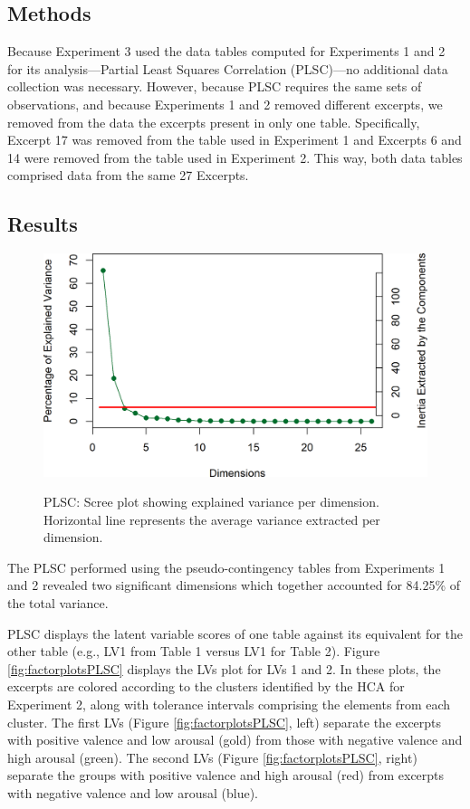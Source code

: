 \documentclass[
  english,
  man]{apa6}
\begin{document}
\hypertarget{methods-2}{%
\subsection{Methods}\label{methods-2}}

Because Experiment 3 used the data tables computed for Experiments 1 and 2 for its analysis---Partial Least Squares Correlation (PLSC)---no additional data collection was necessary. However, because PLSC requires the same sets of observations, and because Experiments 1 and 2 removed different excerpts, we removed from the data the excerpts present in only one table. Specifically, Excerpt 17 was removed from the table used in Experiment 1 and Excerpts 6 and 14 were removed from the table used in Experiment 2. This way, both data tables comprised data from the same 27 Excerpts.

\hypertarget{results-2}{%
\subsection{Results}\label{results-2}}

\begin{figure}  
  \begin{center}
  \caption{PLSC: Scree plot showing explained variance per dimension. Horizontal line represents the average variance extracted per dimension.}
    \includegraphics[width=0.6\columnwidth]{./Music-Descriptor-Space_files/figure-latex/screePLSCcode-1.png}
  \label{fig:screePLSC}  
 \end{center}
\end{figure}

The PLSC performed using the pseudo-contingency tables from Experiments 1 and 2 revealed two significant dimensions which together accounted for 84.25\% of the total variance.

PLSC displays the latent variable scores of one table against its equivalent for the other table (e.g., LV1 from Table 1 versus LV1 for Table 2). Figure \ref{fig:factorplotsPLSC} displays the LVs plot for LVs 1 and 2. In these plots, the excerpts are colored according to the clusters identified by the HCA for Experiment 2, along with tolerance intervals comprising the elements from each cluster. The first LVs (Figure \ref{fig:factorplotsPLSC}, left) separate the excerpts with positive valence and low arousal (gold) from those with negative valence and high arousal (green). The second LVs (Figure \ref{fig:factorplotsPLSC}, right) separate the groups with positive valence and high arousal (red) from excerpts with negative valence and low arousal (blue).
\end{document}
